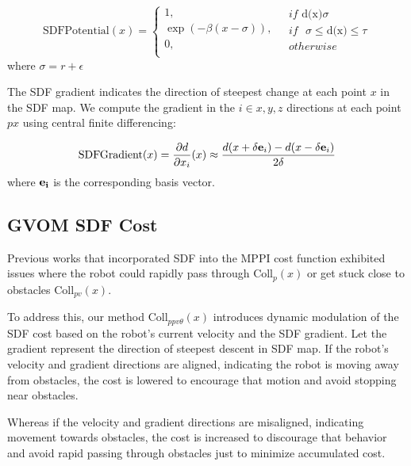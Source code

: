 \documentclass{article}
\begin{document}
	\[\text{SDFPotential}(x)=\left\{ \begin{array}{*{35}{r}}
		1,  \\
		\exp (-\beta (x-\sigma )),  \\
		0,  \\
	\end{array} \right.\text{      }\begin{array}{*{35}{l}}
		if\text{ d(x)}\sigma   \\
		if\text{ }\sigma \le \text{d(x)}\le \tau   \\
		otherwise  \\
	\end{array}
	\]
	where $ \sigma = r+\epsilon $
	
	The SDF gradient indicates the direction of steepest change at each point $x$ in the SDF map. We compute the gradient in the $i \in {x,y,z}$ directions at each point $px$ using central finite differencing:
	
	\[\text{SDFGradient}(x) = \frac{{\partial d}}{{\partial {x_i}}}(x) \approx \frac{{d(x + \delta {{\bf{e}}_i}) - d(x - \delta {{\bf{e}}_i})}}{{2\delta }}\]
	where  $\bf{e}_i$ is the corresponding basis vector.
	
\subsection{GVOM SDF Cost}
Previous works that incorporated SDF into the MPPI cost function exhibited issues where the robot could rapidly pass through $\text{Coll}_{p}(x)$ or get stuck close to obstacles $\text{Coll}_{pv}(x)$.

To address this, our method $\text{Coll}_{ppv\theta}(x)$ introduces dynamic modulation of the SDF cost based on the robot's current velocity and the SDF gradient.
Let the gradient represent the direction of steepest descent in SDF map.
If the robot's velocity and gradient directions are aligned, indicating the robot is moving away from obstacles, the cost is lowered to encourage that motion and avoid stopping near obstacles.

Whereas if the velocity and gradient directions are misaligned, indicating movement towards obstacles, the cost is increased to discourage that behavior and avoid rapid passing through obstacles just to minimize accumulated cost.
\end{document}

